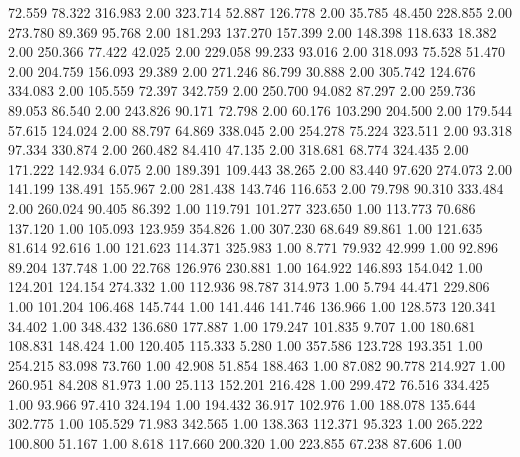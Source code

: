   72.559   78.322  316.983         2.00
 323.714   52.887  126.778         2.00
  35.785   48.450  228.855         2.00
 273.780   89.369   95.768         2.00
 181.293  137.270  157.399         2.00
 148.398  118.633   18.382         2.00
 250.366   77.422   42.025         2.00
 229.058   99.233   93.016         2.00
 318.093   75.528   51.470         2.00
 204.759  156.093   29.389         2.00
 271.246   86.799   30.888         2.00
 305.742  124.676  334.083         2.00
 105.559   72.397  342.759         2.00
 250.700   94.082   87.297         2.00
 259.736   89.053   86.540         2.00
 243.826   90.171   72.798         2.00
  60.176  103.290  204.500         2.00
 179.544   57.615  124.024         2.00
  88.797   64.869  338.045         2.00
 254.278   75.224  323.511         2.00
  93.318   97.334  330.874         2.00
 260.482   84.410   47.135         2.00
 318.681   68.774  324.435         2.00
 171.222  142.934    6.075         2.00
 189.391  109.443   38.265         2.00
  83.440   97.620  274.073         2.00
 141.199  138.491  155.967         2.00
 281.438  143.746  116.653         2.00
  79.798   90.310  333.484         2.00
 260.024   90.405   86.392         1.00
 119.791  101.277  323.650         1.00
 113.773   70.686  137.120         1.00
 105.093  123.959  354.826         1.00
 307.230   68.649   89.861         1.00
 121.635   81.614   92.616         1.00
 121.623  114.371  325.983         1.00
   8.771   79.932   42.999         1.00
  92.896   89.204  137.748         1.00
  22.768  126.976  230.881         1.00
 164.922  146.893  154.042         1.00
 124.201  124.154  274.332         1.00
 112.936   98.787  314.973         1.00
   5.794   44.471  229.806         1.00
 101.204  106.468  145.744         1.00
 141.446  141.746  136.966         1.00
 128.573  120.341   34.402         1.00
 348.432  136.680  177.887         1.00
 179.247  101.835    9.707         1.00
 180.681  108.831  148.424         1.00
 120.405  115.333    5.280         1.00
 357.586  123.728  193.351         1.00
 254.215   83.098   73.760         1.00
  42.908   51.854  188.463         1.00
  87.082   90.778  214.927         1.00
 260.951   84.208   81.973         1.00
  25.113  152.201  216.428         1.00
 299.472   76.516  334.425         1.00
  93.966   97.410  324.194         1.00
 194.432   36.917  102.976         1.00
 188.078  135.644  302.775         1.00
 105.529   71.983  342.565         1.00
 138.363  112.371   95.323         1.00
 265.222  100.800   51.167         1.00
   8.618  117.660  200.320         1.00
 223.855   67.238   87.606         1.00
